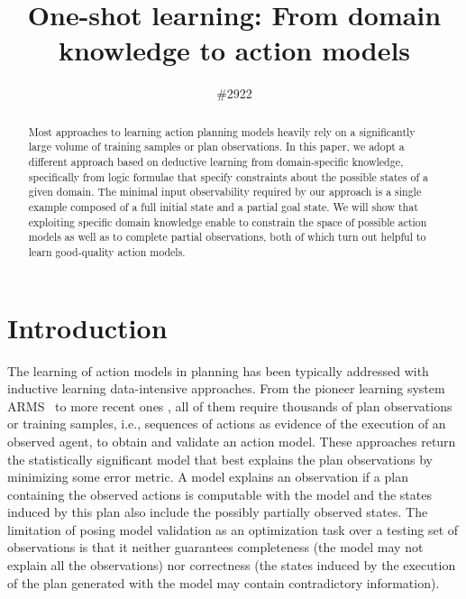 \documentclass{article}
\title{One-shot learning: From domain knowledge to action models}
\author{\#2922}
\newcommand{\ARMS}{{\small {\sffamily ARMS}}\xspace}
\begin{document}
\maketitle


\begin{abstract}
Most approaches to learning action planning models heavily rely on a significantly large volume of training samples or plan observations. In this paper, we adopt a different approach based on deductive learning from domain-specific knowledge, specifically from logic formulae that specify constraints about the possible states of a given domain. The minimal input observability required by our approach is a single example composed of a full initial state and a partial goal state. We will show that exploiting specific domain knowledge enable to constrain the space of possible action models as well as to complete partial observations, both of which turn out helpful to learn good-quality action models.
 \end{abstract}



\section{Introduction}
\label{sec:introduction}

The learning of action models in planning has been typically addressed with inductive learning data-intensive approaches. From the pioneer learning system \ARMS~\cite{yang2007learning} to more recent ones \cite{MouraoZPS12,zhuo2013action,kuvcera2018louga}, all of them require thousands of plan observations or training samples, i.e., sequences of actions as evidence of the execution of an observed agent, to obtain and validate an action model. These approaches return the statistically significant model that best explains the plan observations by minimizing some error metric. A model explains an observation if a plan containing the observed actions is computable with the model and the states induced by this plan also include the possibly partially observed states. The limitation of posing model validation as an optimization task over a testing set of observations is that it neither guarantees completeness (the model may not explain all the observations) nor correctness (the states induced by the execution of the plan generated with the model may contain contradictory information).
\end{document}
